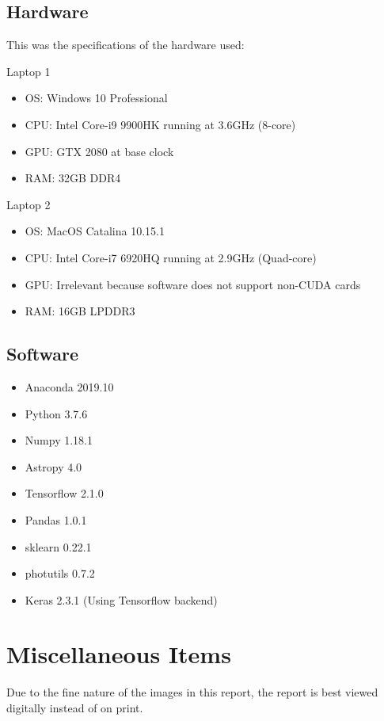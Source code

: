 \documentclass[a4paper,fleqn,usenatbib]{mnras}
\begin{document}
\subsection{Hardware}
This was the specifications of the hardware used:

Laptop 1
\begin{itemize}
\item OS: Windows 10 Professional
\item CPU: Intel Core-i9 9900HK running at 3.6GHz (8-core)
\item GPU: GTX 2080 at base clock
\item RAM: 32GB DDR4
\end{itemize}

Laptop 2
\begin{itemize}
\item OS: MacOS Catalina 10.15.1
\item CPU: Intel Core-i7 6920HQ running at 2.9GHz (Quad-core)
\item GPU: Irrelevant because software does not support non-CUDA cards
\item RAM: 16GB LPDDR3
\end{itemize}

\subsection{Software}
\begin{itemize}
\item Anaconda 2019.10
\item Python 3.7.6
\item Numpy 1.18.1
\item Astropy 4.0
\item Tensorflow 2.1.0
\item Pandas 1.0.1
\item sklearn 0.22.1
\item photutils 0.7.2
\item Keras 2.3.1 (Using Tensorflow backend)	
\end{itemize}

\section{Miscellaneous Items}
\label{Misc}
Due to the fine nature of the images in this report, the report is best viewed digitally instead of on print. 

\bsp	%
\label{lastpage}
\end{document}
